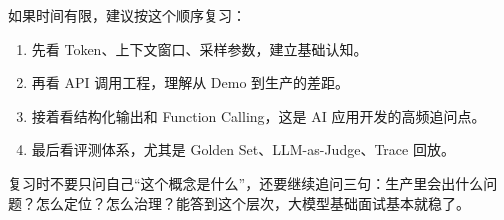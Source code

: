 \documentclass[10pt,a4paper]{ctexart}
\begin{document}
如果时间有限，建议按这个顺序复习：


\begin{enumerate}[itemsep=2pt, topsep=4pt]
  \item 先看 Token、上下文窗口、采样参数，建立基础认知。
  \item 再看 API 调用工程，理解从 Demo 到生产的差距。
  \item 接着看结构化输出和 Function Calling，这是 AI 应用开发的高频追问点。
  \item 最后看评测体系，尤其是 Golden Set、LLM-as-Judge、Trace 回放。
\end{enumerate}


复习时不要只问自己“这个概念是什么”，还要继续追问三句：生产里会出什么问题？怎么定位？怎么治理？能答到这个层次，大模型基础面试基本就稳了。
\end{document}
